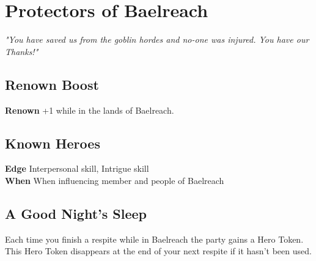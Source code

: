 \documentclass[letterpaper,openany,twoside,twocolumn]{book}
\begin{document}
	
	\rendercharactersheet
	\renderbackgroundsheet
	\renderactionpanelsheet
	\rendertreasuressheet	
	
	
	\section*{Protectors of Baelreach}
	\textit{"You have saved us from the goblin hordes and no-one was injured. You have our Thanks!"}
	\subsection*{Renown Boost}
	\textbf{Renown} +1 while in the lands of Baelreach.
	\subsection*{Known Heroes}
	\textbf{Edge} Interpersonal skill, Intrigue skill\\
	\textbf{When} When influencing member and people of Baelreach
	\subsection*{A Good Night's Sleep}
	Each time you finish a respite while in Baelreach the party gains a Hero Token. This Hero Token disappears at the end of your next respite if it hasn't been used.
\end{document}
